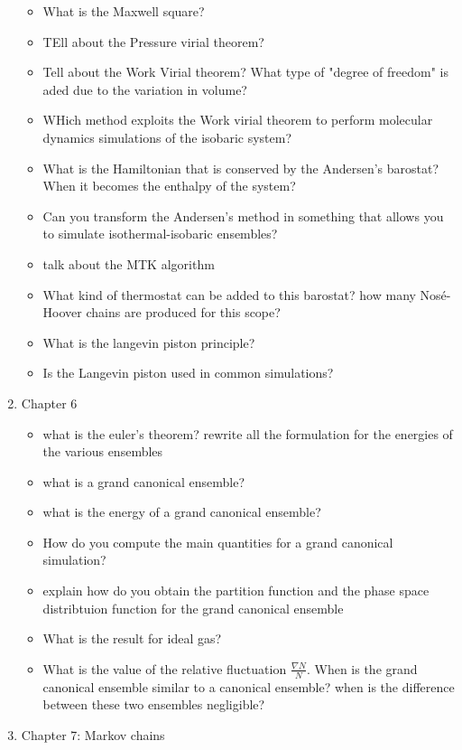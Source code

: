 \begin{enumerate}
\begin{itemize}
        \item What is the Maxwell square?
        \item TEll about the Pressure virial theorem?
        \item Tell about the Work Virial theorem? What type of "degree of freedom" is aded due to the variation in volume?
        \item WHich method exploits the Work virial theorem to perform molecular dynamics simulations of the isobaric system?
        \item What is the Hamiltonian that is conserved by the Andersen's barostat? When it becomes the enthalpy of the system?
        \item Can you transform the Andersen's method in something that allows you to simulate isothermal-isobaric ensembles?
        \item talk about the MTK algorithm
        \item What kind of thermostat can be added to this barostat? how many Nosé-Hoover chains are produced for this scope?
        \item What is the langevin piston principle?
        \item Is the Langevin piston used in common simulations?
    \end{itemize}
    \item Chapter 6
    \begin{itemize}
        \item what is the euler's theorem? rewrite all the formulation for the energies of the various ensembles
        \item what is a grand canonical ensemble?
        \item what is the energy of a grand canonical ensemble?
        \item How do you compute the main quantities for a grand canonical simulation?
        \item explain how do you obtain the partition function and the phase space distribtuion function for the grand canonical ensemble
        \item What is the result for ideal gas?
        \item What is the value of the relative fluctuation $\frac{\nabla N}{N}$. When is the grand canonical ensemble similar to a canonical ensemble? when is the difference between these two ensembles negligible?
    \end{itemize}
    \item Chapter 7: Markov chains
    \begin{itemize}

\end{itemize}
\end{enumerate}
